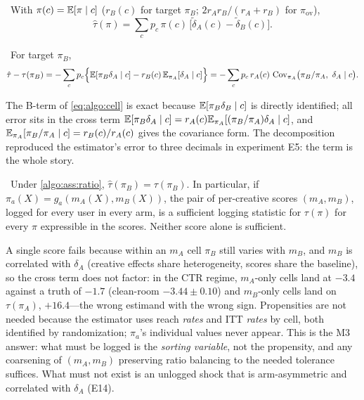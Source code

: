 \begin{construction}
\label{algo:con:cell}
\tagEstablished\ With $\pi(c) = \mathbb{E}[\pi \mid c]$ ($r_B(c)$ for target $\pi_B$; $2r_A r_B/(r_A + r_B)$ for $\pi_{\mathrm{ov}}$),
\begin{equation}
\hat\tau(\pi) = \sum_c p_c\,\pi(c)\,\big[\tilde\delta_A(c) - \tilde\delta_B(c)\big].
\label{eq:algo:cell}
\end{equation}
\end{construction}

\begin{proposition}
\label{algo:prop:error}
\tagEstablished\ For target $\pi_B$,
\begin{equation}
\hat\tau - \tau(\pi_B) = -\sum_c p_c\Big\{\mathbb{E}[\pi_B\delta_A \mid c] - r_B(c)\,\mathbb{E}_{\pi_A}[\delta_A \mid c]\Big\}
 = -\sum_c p_c\, r_A(c)\,\operatorname{Cov}_{\pi_A}\!\big(\pi_B/\pi_A,\ \delta_A \mid c\big).
\label{eq:algo:error}
\end{equation}
\end{proposition}

The B-term of \cref{eq:algo:cell} is exact because $\mathbb{E}[\pi_B\delta_B \mid c]$ is directly identified; all error sits in the cross term $\mathbb{E}[\pi_B\delta_A \mid c] = r_A(c)\mathbb{E}_{\pi_A}[(\pi_B/\pi_A)\delta_A \mid c]$, and $\mathbb{E}_{\pi_A}[\pi_B/\pi_A \mid c] = r_B(c)/r_A(c)$ gives the covariance form. The decomposition reproduced the estimator's error to three decimals in experiment E5: the term is the whole story.

\begin{theorem}
\label{algo:thm:sufficiency}
\tagEstablished\ Under \cref{algo:ass:ratio}, $\hat\tau(\pi_B) = \tau(\pi_B)$. In particular, if $\pi_a(X) = g_a(m_A(X), m_B(X))$, the pair of per-creative scores $(m_A, m_B)$, logged for every user in every arm, is a sufficient logging statistic for $\tau(\pi)$ for every $\pi$ expressible in the scores. Neither score alone is sufficient.
\end{theorem}

A single score fails because within an $m_A$ cell $\pi_B$ still varies with $m_B$, and $m_B$ is correlated with $\delta_A$ (creative effects share heterogeneity, scores share the baseline), so the cross term does not factor: in the CTR regime, $m_A$-only cells land at $-3.4$ against a truth of $-1.7$ (clean-room $-3.44 \pm 0.10$) and $m_B$-only cells land on $\tau(\pi_A)$, $+16.4$---the wrong estimand with the wrong sign. Propensities are not needed because the estimator uses reach \emph{rates} and ITT \emph{rates} by cell, both identified by randomization; $\pi_a$'s individual values never appear. This is the M3 answer: what must be logged is the \emph{sorting variable}, not the propensity, and any coarsening of $(m_A, m_B)$ preserving ratio balancing to the needed tolerance suffices. What must not exist is an unlogged shock that is arm-asymmetric and correlated with $\delta_A$ (E14).

